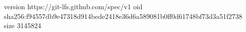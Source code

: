 version https://git-lfs.github.com/spec/v1
oid sha256:f94557db9e47318d914bede2418e36d6a589081b0ff0d61748bf73d3a51f2738
size 3145824
